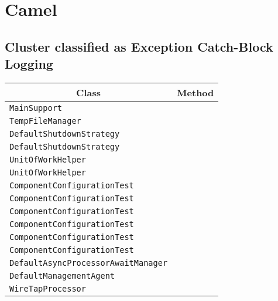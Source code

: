 \section{Camel}\label{camel}

\subsection{Cluster classified as Exception Catch-Block Logging}

\begin{center}
\begin{tabular}{ll}\toprule
\multicolumn{1}{c}{Class}&\multicolumn{1}{c}{Method}\\\midrule
\lstinline/MainSupport/&\raisebox{0pt}{\lstinline/run()/}\\
\lstinline/TempFileManager/&\raisebox{0pt}{\lstinline/cleanUpTempFile()/}\\
\lstinline/DefaultShutdownStrategy/&\raisebox{0pt}{\lstinline/shutdownNow(Consumer)/}\\
\lstinline/DefaultShutdownStrategy/&\raisebox{0pt}{\lstinline/suspendNow(Consumer)/}\\
\lstinline/UnitOfWorkHelper/&\raisebox{0pt}{\lstinline/doneUow(UnitOfWork,Exchange)/}\\
\lstinline/UnitOfWorkHelper/&\raisebox{0pt}{\lstinline/doneUow(UnitOfWorkuow,Exchange)/}\\
\lstinline/ComponentConfigurationTest/&\raisebox{0pt}{\lstinline/createNewDefaultComponentEndpoint()/}\\
\lstinline/ComponentConfigurationTest/&\raisebox{0pt}{\lstinline/configureAnExistingSedaEndpoint()/}\\
\lstinline/ComponentConfigurationTest/&\raisebox{0pt}{\lstinline/createNewSedaUriEndpoint()/}\\
\lstinline/ComponentConfigurationTest/&\raisebox{0pt}{\lstinline/configureAnExistingDefaultEndpoint()/}\\
\lstinline/ComponentConfigurationTest/&\raisebox{0pt}{\lstinline/createNewSedaUriEndpoint()/}\\
\lstinline/ComponentConfigurationTest/&\raisebox{0pt}{\lstinline/createNewDefaultComponentEndpoint()/}\\
\lstinline/DefaultAsyncProcessorAwaitManager/&\raisebox{0pt}{\lstinline/doStop()/}\\
\lstinline/DefaultManagementAgent/&\raisebox{0pt}{\lstinline/run()/}\\
\lstinline/WireTapProcessor/&\raisebox{0pt}{\lstinline/Exchangecall()/}\\

\end{tabular}
\end{center}
